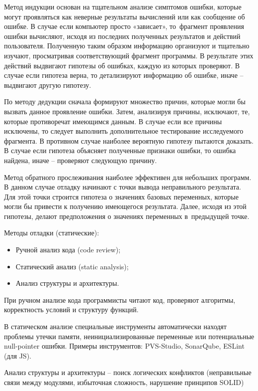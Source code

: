 \documentclass{ou}
\begin{document}
Метод индукции основан на тщательном анализе симптомов ошибки, которые могут проявляться как неверные результаты вычислений или как сообщение об ошибке. В случае если компьютер просто «зависает», то~фрагмент проявления ошибки вычисляют, исходя из последних полученных результатов и действий пользователя. Полученную таким образом информацию организуют и тщательно изучают, просматривая соответствующий фрагмент программы. В результате этих действий выдвигают гипотезы об ошибках, каждую из которых проверяют. В случае если гипотеза верна, то детализируют информацию об ошибке, иначе -- выдвигают другую гипотезу.
 
По методу дедукции сначала формируют множество причин, которые могли бы вызвать данное проявление ошибки. Затем, анализируя причины, исключают, те, которые противоречат имеющимся данным. В случае если все причины исключены, то следует выполнить дополнительное тестирование исследуемого фрагмента. В противном случае наиболее вероятную гипотезу пытаются доказать. В случае если гипотеза объясняет полученные признаки ошибки, то ошибка найдена, иначе -- проверяют следующую причину.
 
Метод обратного прослеживания наиболее эффективен для небольших программ. В данном случае отладку начинают с точки вывода неправильного результата. Для этой точки строится гипотеза о значениях базовых переменных, которые могли бы привести к получению имеющегося результата. Далее, исходя из этой гипотезы, делают предположения о значениях переменных в~предыдущей точке.

Методы отладки (статические):
\begin{itemize}[label=-, leftmargin=0em, itemindent=3.35em, nosep]
\item Ручной анализ кода (code review);
\item Статический анализ (static analysis);
\item Анализ структуры и архитектуры.
\end{itemize}

При ручном анализе кода программисты читают код, проверяют алгоритмы, корректность условий и структуру функций.

В статическом анализе специальные инструменты автоматически находят проблемы утечки памяти, неинициализированные переменные или потенциальные null-pointer ошибки. Примеры инструментов: PVS-Studio, SonarQube, ESLint (для JS).

Анализ структуры и архитектуры -- поиск логических конфликтов (неправильные связи между модулями, избыточная сложность, нарушение принципов SOLID)
\end{document}
